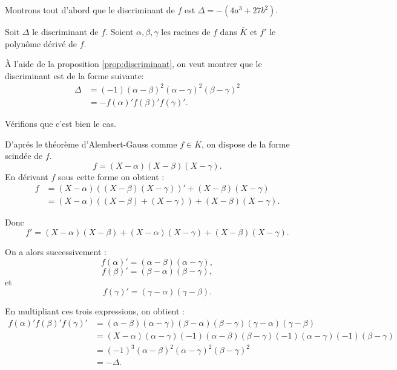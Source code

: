 \begin{demonstration}[Lemme]
    Montrons tout d'abord que le discriminant de $f$ est $\Delta= -(4a^3 + 27b^2)$.

    Soit $\Delta$ le discriminant de $f$. Soient $\alpha, \beta, \gamma $ les racines de $f$ dans $\overline{K}$ et $f'$ le polynôme dérivé de $f$.

    À l'aide de la proposition \ref{prop:discriminant}, on veut montrer que le discriminant est de la forme
    suivante: 
    \begin{align*}
        \Delta &= (-1) ( \alpha - \beta )^2 ( \alpha - \gamma )^2 ( \beta - \gamma )^2 \\
          &= - f(\alpha)'f(\beta )'f(\gamma)'
    .\end{align*}

    Vérifions que c'est bien le cas.

    D'aprés le théorème d'Alembert-Gauss comme $f \in \overline{K}$, on dispose de la
    forme scindée de $f$.
    \[
        f = \left( X - \alpha \right) \left( X - \beta \right) \left( X - \gamma \right) 
    .\] 
    En dérivant $f$ sous cette forme on obtient :
    \begin{align*}
        f &= ( X - \alpha ) \left( ( X - \beta ) ( X - \gamma ) \right)'  + ( X - \beta ) ( X - \gamma )\\
          &= ( X - \alpha ) \left( ( X - \beta ) + ( X - \gamma ) \right) + ( X - \beta ) ( X - \gamma ) 
    .\end{align*}

    Donc  
\[
f' = ( X - \alpha ) ( X - \beta ) + ( X - \alpha ) ( X - \gamma ) + ( X - \beta ) ( X - \gamma )
.\] 

On a alors successivement : 
\[
    f(\alpha)' = ( \alpha - \beta) ( \alpha - \gamma )
,\] 
\[
f(\beta )' = ( \beta - \alpha) ( \beta - \gamma)
,\] 
et
\[
f(\gamma)' = ( \gamma - \alpha) ( \gamma - \beta)
.\] 

En multipliant ces trois expressions, on obtient :
\begin{align*}
    f(\alpha)' f(\beta )' f(\gamma)' &= ( \alpha - \beta ) ( \alpha - \gamma ) ( \beta - \alpha ) ( \beta - \gamma) ( \gamma - \alpha ) ( \gamma - \beta ) \\
&= \left( X - \alpha \right) \left( \alpha - \gamma \right) \left( -1 \right) \left( \alpha - \beta  \right) \left( \beta - \gamma \right) \left( -1 \right) \left( \alpha - \gamma \right) \left( -1 \right) \left( \beta - \gamma \right) \\
&= \left( -1 \right) ^3 \left( \alpha - \beta  \right) ^2 \left( \alpha - \gamma  \right) ^2 \left( \beta - \gamma \right) ^2\\
 &= - \Delta
.\end{align*}


\end{demonstration}
